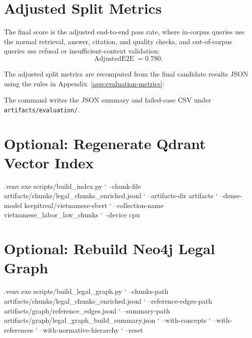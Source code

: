 \section{Adjusted Split Metrics}
The final score is the adjusted end-to-end pass rate, where in-corpus queries use the normal retrieval, answer, citation, and quality checks, and out-of-corpus queries use refusal or insufficient-context validation:
\[
\operatorname{AdjustedE2E} = 0.780.
\]

The adjusted split metrics are recomputed from the final candidate results JSON using the rules in Appendix~\ref{app:evaluation-metrics}:

The command writes the JSON summary and failed-case CSV under \texttt{artifacts/\allowbreak{}evaluation/}.

\section{Optional: Regenerate Qdrant Vector Index}
\begin{ThesisCode}
.venv\Scripts\python.exe scripts/build_index.py `
  --chunk-file artifacts/chunks/legal_chunks_enriched.jsonl `
  --artifacts-dir artifacts `
  --dense-model keepitreal/vietnamese-sbert `
  --collection-name vietnamese_labor_law_chunks `
  --device cpu
\end{ThesisCode}

\section{Optional: Rebuild Neo4j Legal Graph}
\begin{ThesisCode}
.venv\Scripts\python.exe scripts/build_legal_graph.py `
  --chunks-path artifacts/chunks/legal_chunks_enriched.jsonl `
  --reference-edges-path artifacts/graph/reference_edges.jsonl `
  --summary-path artifacts/graph/legal_graph_build_summary.json `
  --with-concepts `
  --with-references `
  --with-normative-hierarchy `
  --reset
\end{ThesisCode}

